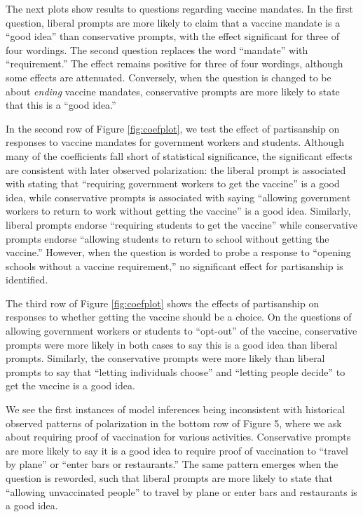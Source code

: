 \documentclass{article}
\begin{document}
The next plots show results to questions regarding vaccine mandates. In
the first question, liberal prompts are more likely to claim that a
vaccine mandate is a ``good idea'' than conservative prompts, with the
effect significant for three of four wordings. The second question
replaces the word ``mandate'' with ``requirement.'' The effect remains
positive for three of four wordings, although some effects are
attenuated. Conversely, when the question is changed to be about
\emph{ending} vaccine mandates, conservative prompts are more likely to
state that this is a ``good idea.''

In the second row of Figure \ref{fig:coefplot}, we test the effect of partisanship on
responses to vaccine mandates for government workers and students.
Although many of the coefficients fall short of statistical
significance, the significant effects are consistent with later observed
polarization: the liberal prompt is associated with stating that
``requiring government workers to get the vaccine'' is a good idea,
while conservative prompts is associated with saying ``allowing
government workers to return to work without getting the vaccine'' is a
good idea. Similarly, liberal prompts endorse ``requiring students to
get the vaccine'' while conservative prompts endorse ``allowing students
to return to school without getting the vaccine.'' However, when the
question is worded to probe a response to ``opening schools without a
vaccine requirement,'' no significant effect for partisanship is
identified.

The third row of Figure \ref{fig:coefplot} shows the effects of partisanship on responses
to whether getting the vaccine should be a choice. On the questions of
allowing government workers or students to ``opt-out'' of the vaccine,
conservative prompts were more likely in both cases to say this is a
good idea than liberal prompts. Similarly, the conservative prompts were
more likely than liberal prompts to say that ``letting individuals
choose'' and ``letting people decide'' to get the vaccine is a good
idea.

We see the first instances of model inferences being inconsistent with
historical observed patterns of polarization in the bottom row of Figure
5, where we ask about requiring proof of vaccination for various
activities. Conservative prompts are more likely to say it is a good
idea to require proof of vaccination to ``travel by plane'' or ``enter
bars or restaurants.'' The same pattern emerges when the question is
reworded, such that liberal prompts are more likely to state that
``allowing unvaccinated people'' to travel by plane or enter bars and
restaurants is a good idea.
\end{document}
